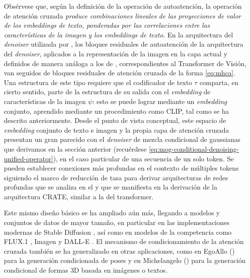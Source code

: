 \documentclass[../../book-main_es.tex]{subfiles}
\begin{document}
Obsérvese que, según la definición de la operación de autoatención, la operación de atención cruzada
\textit{produce combinaciones lineales de las proyecciones de valor de los \textit{embeddings} de texto,
ponderadas por las correlaciones entre las características de la imagen y los \textit{embeddings} de texto.}
En la arquitectura del \textit{denoiser} utilizada por \textcite{rombach2022high},
los bloques residuales de autoatención de la arquitectura del \textit{denoiser}, aplicados a la
representación de la imagen en la capa actual y definidos de manera análoga
a los de , correspondientes al Transformer de Visión, van
seguidos de bloques residuales de atención cruzada
de la forma \eqref{eq:mhca}.
Una estructura de este tipo requiere que el codificador de texto $\tau$ comparta, en cierto
sentido, parte de la
estructura de su salida con el \textit{embedding} de características de la imagen $\psi$: esto se puede
lograr mediante un \textit{embedding} conjunto,
aprendido mediante un procedimiento como CLIP, tal como se ha descrito anteriormente.
Desde el punto de vista conceptual, este espacio de \textit{embedding} conjunto de texto e imagen y la propia capa de atención cruzada
presentan un gran parecido con el
\textit{denoiser} de mezcla condicional de gaussianas que derivamos en la sección anterior
(recuérdese \eqref{eq:mog-conditional-denoising-unified-operator}), en el
caso particular de una secuencia de un solo token. Se pueden establecer conexiones más profundas
en el contexto de múltiples tokens siguiendo el marco de reducción de tasa
para derivar arquitecturas de redes profundas que se analiza en el
 y que se manifiesta en la derivación de la arquitectura CRATE,
similar a la del transformer.

Este mismo diseño básico se ha ampliado aún más, llegando a modelos y conjuntos de datos de mayor tamaño,
en particular en las implementaciones modernas de Stable Diffusion
\cite{DBLP:conf/icml/EsserKBEMSLLSBP24}, así como en modelos de la competencia como
FLUX.1 \cite{Labs2025-fb}, Imagen \cite{Saharia2022-na} y DALL-E
\cite{Ramesh2022-nu}.
El mecanismo de condicionamiento de la atención cruzada también se ha generalizado en
otras aplicaciones, como en EgoAllo () para la
generación condicionada de poses y en Michelangelo
() para la generación condicional de formas 3D basada
en imágenes o textos.
\end{document}
